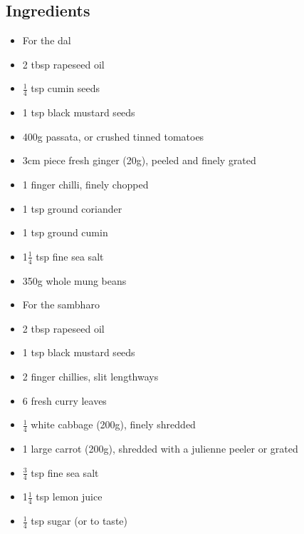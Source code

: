 \documentclass{book}
\begin{document}
\subsection*{Ingredients}
\begin{itemize}
\item For the dal
\item 2 tbsp rapeseed oil
\item $\frac{1}{4}$ tsp cumin seeds
\item 1 tsp black mustard seeds
\item 400g passata, or crushed tinned tomatoes
\item 3cm piece fresh ginger (20g), peeled and finely grated
\item 1 finger chilli, finely chopped
\item 1 tsp ground coriander
\item 1 tsp ground cumin
\item 1$\frac{1}{4}$ tsp fine sea salt
\item 350g whole mung beans
\end{itemize}

\begin{itemize}
\item For the sambharo
\item 2 tbsp rapeseed oil
\item 1 tsp black mustard seeds
\item 2 finger chillies, slit lengthways
\item 6 fresh curry leaves
\item $\frac{1}{4}$ white cabbage (200g), finely shredded
\item 1 large carrot (200g), shredded with a julienne peeler or grated
\item $\frac{3}{4}$ tsp fine sea salt
\item 1$\frac{1}{4}$ tsp lemon juice
\item $\frac{1}{4}$ tsp sugar (or to taste)
\end{itemize}
\end{document}
